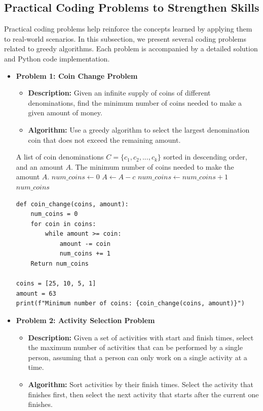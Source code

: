 \documentclass[12pt]{book} %
\begin{document}
\subsection{Practical Coding Problems to Strengthen Skills}
Practical coding problems help reinforce the concepts learned by applying them to real-world scenarios. In this subsection, we present several coding problems related to greedy algorithms. Each problem is accompanied by a detailed solution and Python code implementation.

\begin{itemize}
    \item \textbf{Problem 1: Coin Change Problem}
    \begin{itemize}
        \item \textbf{Description:} Given an infinite supply of coins of different denominations, find the minimum number of coins needed to make a given amount of money.
        \item \textbf{Algorithm:} Use a greedy algorithm to select the largest denomination coin that does not exceed the remaining amount.
    \end{itemize}
    
    \begin{algorithm}
    \caption{Greedy Coin Change Algorithm}
    \begin{algorithmic}[1]
    \Require A list of coin denominations $C = \{c_1, c_2, ..., c_k\}$ sorted in descending order, and an amount $A$.
    \Ensure The minimum number of coins needed to make the amount $A$.
    \State $num\_coins \leftarrow 0$
            \State $A \leftarrow A - c$
            \State $num\_coins \leftarrow num\_coins + 1$
        \EndWhile
    \EndFor
    \Return $num\_coins$
    \end{algorithmic}
    \end{algorithm}

    \FloatBarrier
    \begin{lstlisting}
def coin_change(coins, amount):
    num_coins = 0
    for coin in coins:
        while amount >= coin:
            amount -= coin
            num_coins += 1
    Return num_coins

coins = [25, 10, 5, 1]
amount = 63
print(f"Minimum number of coins: {coin_change(coins, amount)}")
    \end{lstlisting}
    \FloatBarrier

    \item \textbf{Problem 2: Activity Selection Problem}
    \begin{itemize}
        \item \textbf{Description:} Given a set of activities with start and finish times, select the maximum number of activities that can be performed by a single person, assuming that a person can only work on a single activity at a time.
        \item \textbf{Algorithm:} Sort activities by their finish times. Select the activity that finishes first, then select the next activity that starts after the current one finishes.
    \end{itemize}


\end{itemize}
\end{document}
